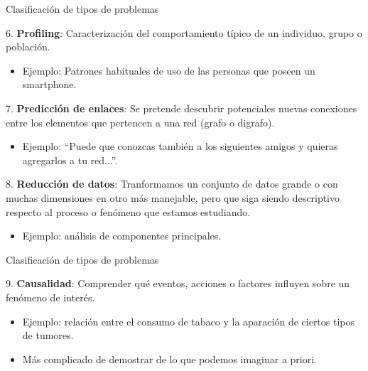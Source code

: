 
\begin{frame}{Clasificación de tipos de problemas}
 \begin{wideitemize}
  \item 6. \textbf{Profiling}: Caracterización del comportamiento típico de un
  individuo, grupo o población.
  \begin{itemize}
   \item Ejemplo: Patrones habituales de uso de las personas que poseen un smartphone.
  \end{itemize}
  
  \item 7. \textbf{Predicción de enlaces}: Se pretende descubrir potenciales
  nuevas conexiones entre los elementos que pertencen a una red (grafo o digrafo).
  \begin{itemize}
   \item Ejemplo: ``Puede que conozcas también a los siguientes amigos y quieras
   agregarlos a tu red...''.
  \end{itemize}
  
  \item 8. \textbf{Reducción de datos}: Tranformamos un conjunto de datos grande
  o con muchas dimensiones en otro más manejable, pero que siga siendo descriptivo
  respecto al proceso o fenómeno que estamos estudiando.
  \begin{itemize}
   \item Ejemplo: análisis de componentes principales.
  \end{itemize}

 \end{wideitemize}

\end{frame}


\begin{frame}{Clasificación de tipos de problemas}
 \begin{wideitemize}
  \item 9. \textbf{Causalidad}: Comprender qué eventos, acciones o factores
  influyen sobre un fenómeno de interés.
  \begin{itemize}
   \item Ejemplo: relación entre el consumo de tabaco y la aparación de ciertos
   tipos de tumores.
   \item Más complicado de demostrar de lo que podemos imaginar a priori.
  \end{itemize}

 \end{wideitemize}

\end{frame}


